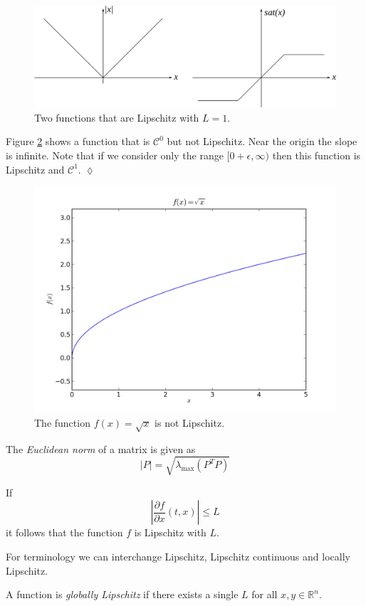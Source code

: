 \begin{figure}[ht!]
	\centering
	\includegraphics[width=.7\textwidth]{images/05lip}
	\caption{Two functions that are Lipschitz with $L=1$.}
	\label{fig:05lip}
\end{figure}

\begin{example}
Figure \ref{fig:05notlip} shows a function that is $\mathcal{C}^0$ but not Lipschitz. Near the origin the slope is infinite. Note that if we consider only the range $[0+\epsilon,\infty)$ then this function is Lipschitz and $\mathcal{C}^1$.
$\lozenge$
\end{example}

\begin{figure}[ht!]
	\centering
	\includegraphics[width=.5\textwidth]{images/plotSqrtX}
	\caption{The function $f(x) = \sqrt{x}$ is not Lipschitz.}
	\label{fig:05notlip}
\end{figure}

\begin{definition}
The \textit{Euclidean norm} of a matrix is given as
$$|P| = \sqrt{\lambda_{\text{max}}(P^TP)}$$
\end{definition}

\begin{lemma}
If
$$\left|\frac{\partial f}{\partial x}(t,x)\right| \leq L$$
it follows that the function $f$ is Lipschitz with $L$.
\end{lemma}
For terminology we can interchange Lipschitz, Lipschitz continuous and locally Lipschitz.

\begin{definition}
A function is \textit{globally Lipschitz} if there exists a single $L$ for all $x,y\in\mathbb{R}^n$.
\end{definition}

